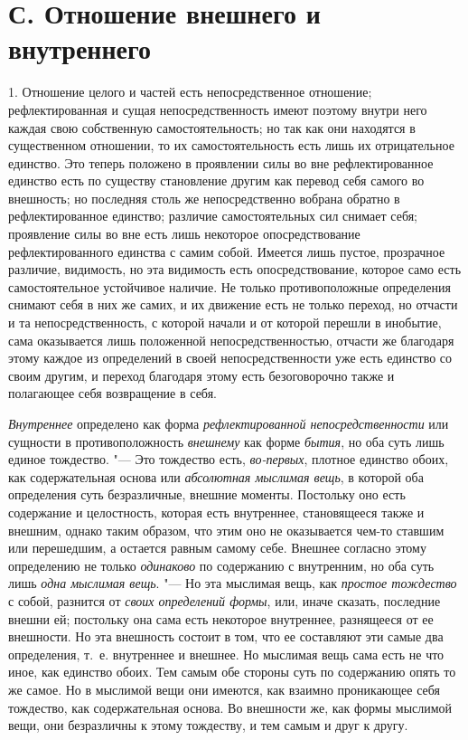 \section[С. Отношение внешнего и внутреннего]
{С. Отношение внешнего и внутреннего}

1. Отношение целого и частей есть
непосредственное отношение; рефлектированная и сущая непосредственность
имеют поэтому внутри него каждая свою собственную самостоятельность; но так
как они находятся в существенном отношении, то их самостоятельность есть
лишь их отрицательное единство. Это теперь положено в проявлении силы во
вне рефлектированное единство есть по существу становление другим как
перевод себя самого во внешность; но последняя столь же непосредственно
вобрана обратно в рефлектированное единство; различие самостоятельных сил
снимает себя; проявление силы во вне есть лишь некоторое опосредствование
рефлектированного единства с самим собой. Имеется лишь пустое, прозрачное
различие, видимость, но эта видимость есть опосредствование, которое само
есть самостоятельное устойчивое наличие. Не только противоположные
определения снимают себя в них же самих, и их движение есть не только
переход, но отчасти и та непосредственность, с которой начали и от которой
перешли в инобытие, сама оказывается лишь положенной непосредственностью,
отчасти же благодаря этому каждое из определений в своей непосредственности
уже есть единство со своим другим, и переход благодаря этому есть
безоговорочно также и полагающее себя возвращение в себя.

{\em Внутреннее} определено как форма
{\em рефлектированной непосредственности} или сущности
в противоположность {\em внешнему} как форме
{\em бытия}, но оба суть лишь единое тождество. "--- Это
тождество есть, {\em во-первых}, плотное единство
обоих, как содержательная основа или {\em абсолютная
мыслимая вещь}, в которой оба определения суть безразличные, внешние
моменты. Постольку оно есть содержание и целостность, которая есть
внутреннее, становящееся также и внешним, однако таким образом, что этим
оно не оказывается чем-то ставшим или перешедшим, а остается равным самому
себе. Внешнее согласно этому определению не только
{\em одинаково} по содержанию с внутренним, но оба суть
лишь {\em одна мыслимая вещь}. "--- Но эта мыслимая вещь,
как {\em простое тождество} с собой, разнится от
{\em своих определений формы}, или, иначе сказать,
последние внешни ей; постольку она сама есть некоторое внутреннее,
разнящееся от ее внешности. Но эта внешность состоит в том, что ее
составляют эти самые два определения, т.~е. внутреннее и внешнее. Но
мыслимая вещь сама есть не что иное, как единство обоих. Тем самым обе
стороны суть по содержанию опять то же самое. Но в мыслимой вещи они
имеются, как взаимно проникающее себя тождество, как содержательная основа.
Во внешности же, как формы мыслимой вещи, они безразличны к этому
тождеству, и тем самым и друг к другу.

